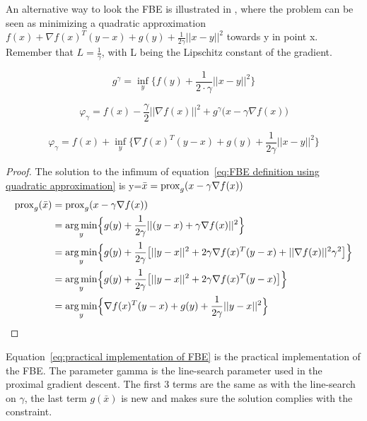 		An alternative way to look the FBE is illustrated in \cite{AjaySathya2017}, where the problem can be seen as minimizing a quadratic approximation  $f(x) +  \nabla f(x)^T(y-x) + g(y) + \frac{1}{2 \gamma} ||x-y||^2  $ towards y in point x.  Remember that $L = \frac{1}{\gamma}$, with L being the Lipschitz constant of the gradient.
		
		\begin{equation}
			g^{\gamma} = \underset{y}{\inf} \big \{f(y)+\frac{1}{2 \cdot \gamma}||x-y||^2 \big \}
			\label{eq:Moreau envelope}
		\end{equation}
		
		\begin{equation}
		\varphi_{\gamma} = f(x) - \frac{\gamma}{2}||\nabla f(x)||^2 + g^{\gamma} \big(x-\gamma \nabla f(x) \big)
		\label{eq:FBE definition using Moreau envelope}
		\end{equation}
		
		\begin{equation}
		\varphi_{\gamma} =   f(x) + \underset{y}{\inf} \Big\{ \nabla f(x)^T(y-x) + g(y) + \frac{1}{2 \gamma} ||x-y||^2  \Big\}
		\label{eq:FBE definition using quadratic approximation}
		\end{equation}
		
		\begin{proof}
			The solution to the infimum of equation~\ref{eq:FBE definition using quadratic approximation} is y=$\bar{x}= \operatorname{prox}_g(x-\gamma \nabla f(x))$
			\begin{align*}
			\operatorname{prox}_g(\bar{x}) 
			&=\operatorname{prox}_g(x- \gamma \nabla f(x)) \\
			&= \underset{y}{\operatorname*{arg\,min}} \Big \{ g(y) 
			+ \frac{1}{2 \gamma}||(y-x) + \gamma \nabla f(x)||^2 \Big \} \\
			&= \underset{y}{\operatorname*{arg\,min}} \Big \{ g(y) 
			+ \frac{1}{2 \gamma} \big[||y-x||^2 + 2 \gamma \nabla f(x)^T(y-x) + ||\nabla f(x)||^2\gamma^2 \big] \Big \} \\
			&= \underset{y}{\operatorname*{arg\,min}} \Big \{ g(y) 
			+ \frac{1}{2 \gamma} \big[||y-x||^2 + 2 \gamma \nabla f(x)^T(y-x)  \big] \Big \}\\
			&= \underset{y}{\operatorname*{arg\,min}} \Big \{   \nabla f(x)^T(y-x)  + g(y) 
			+ \frac{1}{2 \gamma} ||y-x||^2  \Big  \}
			\end{align*}
			\label{prf:prox is solution to FBE inf}
		\end{proof}
		
		Equation~\ref{eq:practical implementation of FBE} is the practical implementation of the FBE. The parameter gamma is the line-search parameter used in the proximal gradient descent. The first 3 terms are the same as with the line-search on $\gamma$, the last term $g(\bar{x})$ is new and makes sure the solution complies with the constraint.
		
